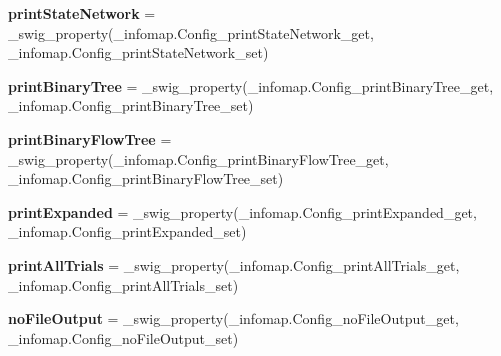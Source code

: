 \begin{DoxyCompactItemize}
\item 
\mbox{\label{classdsmacc_1_1graph_1_1infomap_1_1Config_a645b896192d4512dcc193f7fe8f51b3b}} 
{\bfseries print\+State\+Network} = \+\_\+swig\+\_\+property(\+\_\+infomap.\+Config\+\_\+print\+State\+Network\+\_\+get, \+\_\+infomap.\+Config\+\_\+print\+State\+Network\+\_\+set)
\item 
\mbox{\label{classdsmacc_1_1graph_1_1infomap_1_1Config_a9084d774e6bc70892782a850630277fa}} 
{\bfseries print\+Binary\+Tree} = \+\_\+swig\+\_\+property(\+\_\+infomap.\+Config\+\_\+print\+Binary\+Tree\+\_\+get, \+\_\+infomap.\+Config\+\_\+print\+Binary\+Tree\+\_\+set)
\item 
\mbox{\label{classdsmacc_1_1graph_1_1infomap_1_1Config_ab6acb9eee0909f1847354ecc93174b95}} 
{\bfseries print\+Binary\+Flow\+Tree} = \+\_\+swig\+\_\+property(\+\_\+infomap.\+Config\+\_\+print\+Binary\+Flow\+Tree\+\_\+get, \+\_\+infomap.\+Config\+\_\+print\+Binary\+Flow\+Tree\+\_\+set)
\item 
\mbox{\label{classdsmacc_1_1graph_1_1infomap_1_1Config_aabf37aa4daa9e767ad3ec6ed5d9bf476}} 
{\bfseries print\+Expanded} = \+\_\+swig\+\_\+property(\+\_\+infomap.\+Config\+\_\+print\+Expanded\+\_\+get, \+\_\+infomap.\+Config\+\_\+print\+Expanded\+\_\+set)
\item 
\mbox{\label{classdsmacc_1_1graph_1_1infomap_1_1Config_a2b61e734494e994db490b40a262bba3d}} 
{\bfseries print\+All\+Trials} = \+\_\+swig\+\_\+property(\+\_\+infomap.\+Config\+\_\+print\+All\+Trials\+\_\+get, \+\_\+infomap.\+Config\+\_\+print\+All\+Trials\+\_\+set)
\item 
\mbox{\label{classdsmacc_1_1graph_1_1infomap_1_1Config_a8d55cdc373fe2ca0fdc4222af2599595}} 
{\bfseries no\+File\+Output} = \+\_\+swig\+\_\+property(\+\_\+infomap.\+Config\+\_\+no\+File\+Output\+\_\+get, \+\_\+infomap.\+Config\+\_\+no\+File\+Output\+\_\+set)
\item 
\mbox{\label{classdsmacc_1_1graph_1_1infomap_1_1Config_a41379a959ef953f54e9ccedd11c4c194}} 

\end{DoxyCompactItemize}
